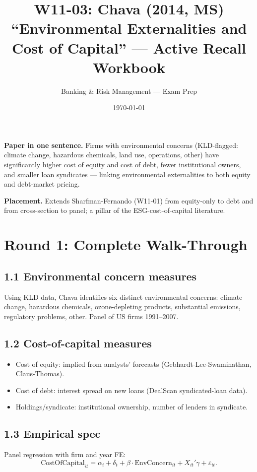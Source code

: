 \documentclass[11pt]{article}
\title{W11-03: Chava (2014, MS) \\
\large ``Environmental Externalities and Cost of Capital'' --- Active Recall Workbook}
\author{Banking \& Risk Management --- Exam Prep}
\date{\today}
\begin{document}
\maketitle

\begin{keybox}
\textbf{Paper in one sentence.} Firms with environmental concerns (KLD-flagged: climate change, hazardous chemicals, land use, operations, other) have significantly higher cost of equity and cost of debt, fewer institutional owners, and smaller loan syndicates --- linking environmental externalities to both equity and debt-market pricing.

\textbf{Placement.} Extends Sharfman-Fernando (W11-01) from equity-only to debt and from cross-section to panel; a pillar of the ESG-cost-of-capital literature.
\end{keybox}

\section*{Round 1: Complete Walk-Through}

\subsection*{1.1 Environmental concern measures}
Using KLD data, Chava identifies six distinct environmental concerns: climate change, hazardous chemicals, ozone-depleting products, substantial emissions, regulatory problems, other. Panel of US firms 1991--2007.

\subsection*{1.2 Cost-of-capital measures}
\begin{itemize}
\item Cost of equity: implied from analysts' forecasts (Gebhardt-Lee-Swaminathan, Claus-Thomas).
\item Cost of debt: interest spread on new loans (DealScan syndicated-loan data).
\item Holdings/syndicate: institutional ownership, number of lenders in syndicate.
\end{itemize}

\subsection*{1.3 Empirical spec}
Panel regression with firm and year FE:
\[
\text{CostOfCapital}_{it}=\alpha_i+\delta_t+\beta\cdot\text{EnvConcern}_{it}+X_{it}'\gamma+\varepsilon_{it}.
\]
\end{document}
